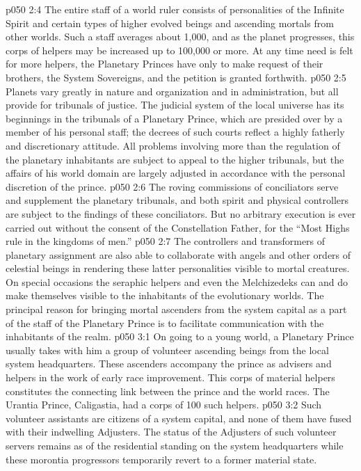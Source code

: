 \vs p050 2:4 The entire staff of a world ruler consists of personalities of the Infinite Spirit and certain types of higher evolved beings and ascending mortals from other worlds. Such a staff averages about 1,000, and as the planet progresses, this corps of helpers may be increased up to 100,000 or more. At any time need is felt for more helpers, the Planetary Princes have only to make request of their brothers, the System Sovereigns, and the petition is granted forthwith.
\vs p050 2:5 Planets vary greatly in nature and organization and in administration, but all provide for tribunals of justice. The judicial system of the local universe has its beginnings in the tribunals of a Planetary Prince, which are presided over by a member of his personal staff; the decrees of such courts reflect a highly fatherly and discretionary attitude. All problems involving more than the regulation of the planetary inhabitants are subject to appeal to the higher tribunals, but the affairs of his world domain are largely adjusted in accordance with the personal discretion of the prince.
\vs p050 2:6 The roving commissions of conciliators serve and supplement the planetary tribunals, and both spirit and physical controllers are subject to the findings of these conciliators. But no arbitrary execution is ever carried out without the consent of the Constellation Father, for the “Most Highs rule in the kingdoms of men.”
\vs p050 2:7 The controllers and transformers of planetary assignment are also able to collaborate with angels and other orders of celestial beings in rendering these latter personalities visible to mortal creatures. On special occasions the seraphic helpers and even the Melchizedeks can and do make themselves visible to the inhabitants of the evolutionary worlds. The principal reason for bringing mortal ascenders from the system capital as a part of the staff of the Planetary Prince is to facilitate communication with the inhabitants of the realm.
\vs p050 3:1 On going to a young world, a Planetary Prince usually takes with him a group of volunteer ascending beings from the local system headquarters. These ascenders accompany the prince as advisers and helpers in the work of early race improvement. This corps of material helpers constitutes the connecting link between the prince and the world races. The Urantia Prince, Caligastia, had a corps of 100 such helpers.
\vs p050 3:2 \pc Such volunteer assistants are citizens of a system capital, and none of them have fused with their indwelling Adjusters. The status of the Adjusters of such volunteer servers remains as of the residential standing on the system headquarters while these morontia progressors temporarily revert to a former material state.
